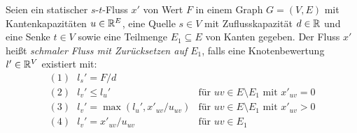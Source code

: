 \begin{definition}\label{def-thin-flow}
	Seien ein statischer $s$-$t$-Fluss $x'$ von Wert $F$ in einem Graph $G=(V,E)$ mit Kantenkapazitäten $u\in\mathbb{R}^E$, eine Quelle $s\in V$ mit Zuflusskapazität $d\in\mathbb{R}$ und eine Senke $t\in V$ sowie eine Teilmenge $E_1\subseteq E$ von Kanten gegeben.
	Der Fluss $x'$ heißt \emph{schmaler Fluss mit Zurücksetzen auf $E_1$}, falls eine Knotenbewertung $l'\in\mathbb{R}^V$ existiert mit:
	$$\begin{array}{ll}
	(1)~~~	l_s' = F/d& \\
	(2)~~~	l_v' \leq l_u' &\text{für $uv\in E \setminus E_1$ mit $x'_{uv}=0$}\\
	(3)~~~	l_v' = \max(l_u', x'_{uv} / u_{uv} ) &\text{für $uv\in E\setminus E_1$ mit $x'_{uv} > 0$}\\
	(4)~~~	l_v' = x'_{uv} / u_{uv} & \text{für $uv\in E_1$}
	\end{array}$$
\end{definition}

